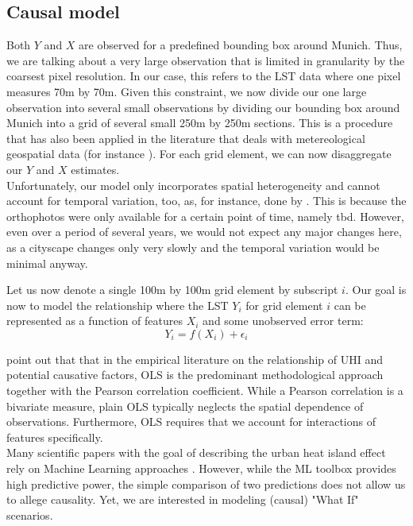 \documentclass[12pt]{article}
\begin{document}
\newpage
\subsection{Causal model}

Both $Y$ and $X$ are observed for a predefined bounding box around Munich. Thus, we are talking about a very large observation that is limited in granularity by the coarsest pixel resolution. In our case, this refers to the LST data \citep{ecostress2019} where one pixel measures 70m by 70m. Given this constraint, we now divide our one large observation into several small observations by dividing our bounding box around Munich into a grid of several small 250m by 250m sections. This is a procedure that has also been applied in the literature that deals with metereological geospatial data (for instance \citep{kikon2016}). For each grid element, we can now disaggregate our $Y$ and $X$ estimates.\\
Unfortunately, our model only incorporates spatial heterogeneity and cannot account for temporal variation, too, as, for instance, done by \citet{seebacher2019}. This is because the orthophotos were only available for a certain point of time, namely tbd. However, even over a period of several years, we would not expect any major changes here, as a cityscape changes only very slowly and the temporal variation would be minimal anyway.

Let us now denote a single 100m by 100m grid element by subscript $i$. Our goal is now to model the relationship where the LST $Y_i$ for grid element $i$ can be represented as a function of features $X_i$ and some unobserved error term:
\begin{equation}
Y_i = f(X_i) + \epsilon_i
\end{equation}

\citet{deilami2018, ward2016} point out that that in the empirical literature on the relationship of UHI and potential causative factors, OLS is the predominant methodological approach together with the Pearson correlation coefficient. While a Pearson correlation is a bivariate measure, plain OLS typically neglects the spatial dependence of observations. Furthermore, OLS requires that we account for interactions of features specifically.\\
Many scientific papers with the goal of describing the urban heat island effect rely on Machine Learning approaches \citep{khalil2021,kikon2016,seebacher2019}. However, while the ML toolbox provides high predictive power, the simple comparison of two predictions does not allow us to allege causality. Yet, we are interested in modeling (causal) "What If" scenarios.
\end{document}
